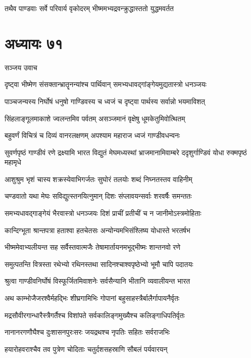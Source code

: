 \twolineshloka
{तथैव पाण्डवाः सर्वे परिवार्य वृकोदरम्}
{भीष्ममभ्यद्रवन्क्रुद्धास्ततो युद्धमवर्तत}


\chapter{अध्यायः ७१}
\twolineshloka
{सञ्जय उवाच}
{}


\twolineshloka
{दृष्ट्वा भीष्मेण संसक्तान्भ्रातॄनन्यांश्च पार्थिवान्}
{समभ्यधावद्गांङ्गेयमुद्यतास्त्रो धनञ्जयः}


\twolineshloka
{पाञ्चजन्यस्य निर्घोषं धनुषो गाण्डिवस्य च}
{ध्वजं च दृष्ट्वा पार्थस्य सर्वान्नो भयमाविशत्}


\twolineshloka
{सिंहलाङ्गूलमाकाशे ज्वलन्तमिव पर्वतम्}
{असञ्जमानं वृक्षेषु धूमकेतुमिवोत्थितम्}


\twolineshloka
{बहुवर्णं विचित्रं च दिव्यं वानरलक्षणम्}
{अपश्याम महाराज ध्वजं गाण्डीवधन्वनः}


\threelineshloka
{सुवर्णपृष्ठं गाण्डीवं रणे द्रक्ष्यामि भारत}
{विद्युतं मेघमध्यस्थां भ्राजमानामिवाम्बरे}
{ददृशुर्गाण्डिवं योधा रुक्मपृष्ठं महामृधे}


\twolineshloka
{आशुश्रुम भृशं चास्य शक्रस्येवाभिगर्जतः}
{सुघोरं तलयोः शब्दं निघ्नतस्तव वाहिनीम्}


\twolineshloka
{चण्डवातो यथा मेघः सविद्युत्स्तनयित्नुमान्}
{दिशः संप्लावयन्सर्वाः शरवर्षैः समन्ततः}


\twolineshloka
{समभ्यधावद्गाङ्गेयं भैरवास्त्रो धनञ्जयः}
{दिशं प्राचीं प्रतीचीं च न जानीमोऽस्त्रमोहिताः}


\twolineshloka
{कान्दिग्भूता श्रान्तपत्रा हताश्वा हतचेतसः}
{अन्योन्यमभिसंश्लिष्य योधास्ते भरतर्षभ}


\twolineshloka
{भीष्ममेवाभ्यलीयन्त सह सर्वैस्तवात्मजैः}
{तेषामार्तायनमभूद्भीष्मः शान्तनवो रणे}


\twolineshloka
{समुत्पतन्ति वित्रस्ता रथेभ्यो रथिनस्तथा}
{सादिनश्चाश्वपृष्ठेभ्यो भूमौ चापि पदातयः}


\twolineshloka
{श्रुत्वा गाण्डीवनिर्घोषं विस्फूर्जितमिवाशनेः}
{सर्वसैन्यानि भीतानि व्यवालीयन्त भारत}


\twolineshloka
{अथ काम्भोजैजरश्वैर्महद्भिः शीघ्रगामिभिः}
{गोपानां बहुसाहस्त्रैर्बालैर्गापायनैर्वृतः}


\twolineshloka
{मद्रसौवीरगान्धारैस्त्रैगर्तैश्च विशांपते}
{सर्वकालिङ्गमुख्यैश्च कलिङ्गाधिपतिर्वृतः}


\twolineshloka
{नानानरगणौघैश्च दुःशासनपुरःसरः}
{जयद्रथश्च नृपतिः सहितः सर्वराजभिः}


\twolineshloka
{हयारोहवराश्चैव तव पुत्रेण चोदिताः}
{चतुर्दशसहस्राणि सौबलं पर्यवारयन्}


